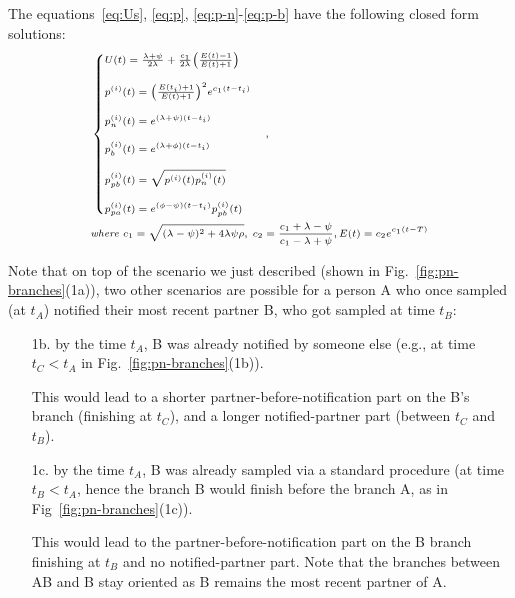 \documentclass[10pt,letterpaper]{article}
\begin{document}
The equations~\ref{eq:Us}, \ref{eq:p}, \ref{eq:p-n}-\ref{eq:p-b} have the following closed form solutions:
\begin{equation}
\scriptsize
\begin{split}
&\begin{cases}
U(t) = \frac{\lambda + \psi}{2\lambda} +  \frac{c_1}{2\lambda}\Big(\frac{E(t) - 1}{E(t) + 1}\Big)\\
\\
p^{(i)}(t) = \Big(\frac{E(t_i) + 1}{E(t) + 1}\Big)^2 e^{c_1 (t -t_i)} \\
\\
p_n^{(i)}(t) =  e^{(\lambda + \psi) (t -t_i)}\\
\\
p_b^{(i)}(t) =  e^{(\lambda + \phi) (t -t_i)}
\\
\\
p_{pb}^{(i)}(t) =  \sqrt{p^{(i)}(t)p_n^{(i)}(t)} \\
\\
p_{pa}^{(i)}(t) =  e^{(\phi-\psi) (t -t_i)} p_{pb}^{(i)}(t) 
\end{cases},\\
& \textit{where } c_1 = \sqrt{(\lambda - \psi)^2 + 4 \lambda\psi\rho},\; c_2 = \frac{c_1 + \lambda - \psi}{c_1 - \lambda + \psi}, E(t) = c_2 e^{c_1 (t -T)} \\
\end{split}\label{eq:ps}
\end{equation}



Note that on top of the scenario we just described (shown in Fig.~\ref{fig:pn-branches}(1a)), two other scenarios are possible for a person A who once sampled (at $t_A$) notified their most recent partner B, who got sampled at time $t_B$:
\begin{enumerate}

\item[1b.] by the time $t_A$, B was already notified by someone else (e.g., at time $t_C < t_A$ in  Fig.~\ref{fig:pn-branches}(1b)).

This would lead to a shorter partner-before-notification part on the B's branch (finishing at $t_C$), and a longer notified-partner part (between $t_C$ and $t_B$). 
 

\item[1c.] by the time $t_A$, B was already sampled via a standard procedure (at time $t_B < t_A$, hence the branch B would finish before the branch A, as in Fig~\ref{fig:pn-branches}(1c)).

This would lead to the partner-before-notification part on the B branch finishing at $t_B$ and no notified-partner part. Note that the branches between AB and B stay oriented as B remains the most recent partner of A.
\end{enumerate}
\end{document}
